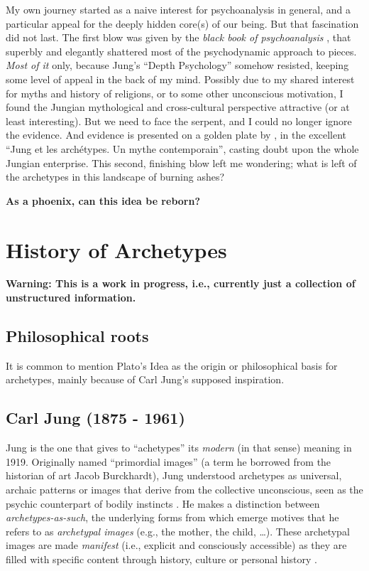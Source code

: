 \documentclass[]{book}
\begin{document}
My own journey started as a naive interest for psychoanalysis in general, and a particular appeal for the deeply hidden core(s) of our being. But that fascination did not last. The first blow was given by the \emph{black book of psychoanalysis} \citep[``Le livre noir de la psychanalyse'';][]{borch2005livre}, that superbly and elegantly shattered most of the psychodynamic approach to pieces. \emph{Most of it} only, because Jung's ``Depth Psychology'' somehow resisted, keeping some level of appeal in the back of my mind. Possibly due to my shared interest for myths and history of religions, or to some other unconscious motivation, I found the Jungian mythological and cross-cultural perspective attractive (or at least interesting). But we need to face the serpent, and I could no longer ignore the evidence. And evidence is presented on a golden plate by \citet{lequellec2013jung}, in the excellent ``Jung et les archétypes. Un mythe contemporain'', casting doubt upon the whole Jungian enterprise. This second, finishing blow left me wondering; what is left of the archetypes in this landscape of burning ashes?

\textbf{As a phoenix, can this idea be reborn?}

\hypertarget{history-of-archetypes}{%
\chapter{History of Archetypes}\label{history-of-archetypes}}

\textbf{Warning: This is a work in progress, i.e., currently just a collection of unstructured information.}

\hypertarget{philosophical-roots}{%
\section{Philosophical roots}\label{philosophical-roots}}

It is common to mention Plato's Idea as the origin or philosophical basis for archetypes, mainly because of Carl Jung's supposed inspiration.

\hypertarget{carl-jung-1875---1961}{%
\section{Carl Jung (1875 - 1961)}\label{carl-jung-1875---1961}}

Jung is the one that gives to ``achetypes'' its \emph{modern} (in that sense) meaning in 1919. Originally named ``primordial images'' (a term he borrowed from the historian of art Jacob Burckhardt), Jung understood archetypes as universal, archaic patterns or images that derive from the collective unconscious, seen as the psychic counterpart of bodily instincts \citep{feist2009theories}. He makes a distinction between \emph{archetypes-as-such}, the underlying forms from which emerge motives that he refers to as \emph{archetypal images} (e.g., the mother, the child, \ldots). These archetypal images are made \emph{manifest} (i.e., explicit and consciously accessible) as they are filled with specific content through history, culture or personal history \citep{papadopoulos2012}.
\end{document}
